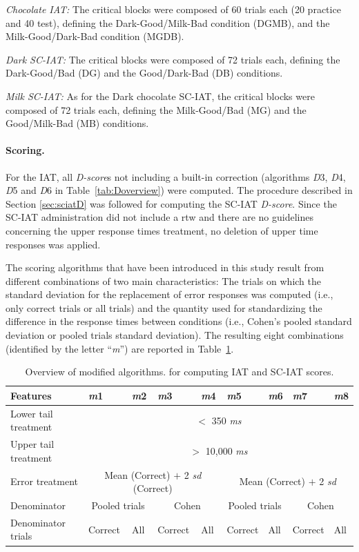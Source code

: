 \documentclass[12pt]{book}
\begin{document}
\emph{Chocolate IAT:} The critical blocks were composed of 60 trials each (20 practice and 40 test), defining the Dark-Good/Milk-Bad condition (DGMB), and the Milk-Good/Dark-Bad condition (MGDB). 

\emph{Dark SC-IAT:} The critical blocks were composed of 72 trials each, defining the Dark-Good/Bad (DG) and the Good/Dark-Bad (DB) conditions.

\emph{Milk SC-IAT:} As for the Dark chocolate SC-IAT, the critical blocks were composed of 72 trials each, defining the Milk-Good/Bad (MG) and the Good/Milk-Bad (MB) conditions.

\paragraph{Scoring.}

For the IAT, all \emph{D-score}s not including a built-in correction (algorithms \emph{D}3, \emph{D}4, \emph{D}5 and \emph{D}6 in Table~\ref{tab:Doverview}) were computed. The procedure described in Section \ref{sec:sciatD} was followed for computing the SC-IAT \emph{D-score}.
Since the SC-IAT administration did not include a rtw and there are no guidelines concerning the upper response times treatment, no deletion of upper time responses was applied. 

The scoring algorithms that have been introduced in this study result from different combinations of two main characteristics: The trials on which the standard deviation for the replacement of error responses was computed (i.e., only correct trials or all trials) and the quantity used for standardizing the difference in the response times between conditions (i.e., Cohen's pooled standard deviation or pooled trials standard deviation). 
The resulting eight combinations (identified by the letter ``\emph{m}'') are reported in Table~\ref{tab:modified}. 

\begin{table}[h!]
	\centering \doublespacing 
	\caption{\label{tab:modified} Overview of modified algorithms. for computing IAT and SC-IAT scores.}
	\begin{tabular}{l p{1cm} p{1cm}p{1cm} p{1cm}p{1cm} p{1cm}p{1cm} p{1cm}}
		\toprule
		Features & \emph{m}1 & \emph{m}2  & \emph{m}3 & \emph{m}4 & \emph{m}5 & \emph{m}6 & \emph{m}7 & \emph{m}8 \\
		\midrule
		Lower tail treatment & \multicolumn{8}{c}{$<$ 350 \emph{ms}}\\
		Upper tail treatment & \multicolumn{8}{c}{$>$ 10,000 \emph{ms}}\\
		Error treatment & \multicolumn{4}{c}{Mean (Correct) $+$ 2 \emph{sd} (Correct)}  & \multicolumn{4}{c}{Mean (Correct) $+$ 2 \emph{sd}}\\
		Denominator & \multicolumn{2}{c}{Pooled trials} & \multicolumn{2}{c}{Cohen} & \multicolumn{2}{c}{Pooled trials} & \multicolumn{2}{c}{Cohen}\\  
		Denominator trials & Correct & All  & Correct & All & Correct & All & Correct & All \\
		\bottomrule
	\end{tabular}
\end{table}
\end{document}
